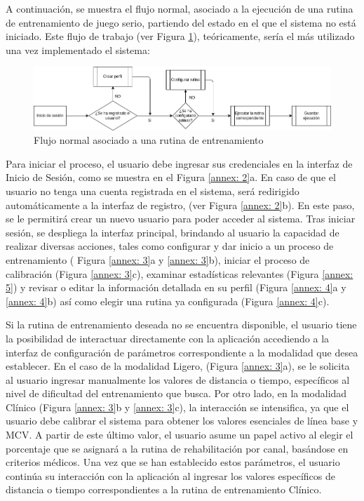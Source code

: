 A continuación, se muestra el flujo normal, asociado a la ejecución de una rutina de entrenamiento de juego serio, partiendo del estado en el que el sistema no está iniciado. Este flujo de trabajo (ver Figura \ref{fig: diagram-flow}), teóricamente, sería el más utilizado una vez implementado el sistema:

\begin{figure}[!ht]
    \centering
    \includegraphics[scale=0.5]{images/diagram-flow.png}
    \caption{Flujo normal asociado a una rutina de entrenamiento}
    \label{fig: diagram-flow}
\end{figure}

Para iniciar el proceso, el usuario debe ingresar sus credenciales en la interfaz de Inicio de Sesión, como se muestra en el Figura \ref{annex: 2}a. En caso de que el usuario no tenga una cuenta registrada en el sistema, será redirigido automáticamente a la interfaz de registro, (ver Figura \ref{annex: 2}b). En este paso, se le permitirá crear un nuevo usuario para poder acceder al sistema. Tras iniciar sesión, se despliega la interfaz principal, brindando al usuario la capacidad de realizar diversas acciones, tales como configurar y dar inicio a un proceso de entrenamiento ( Figura \ref{annex: 3}a y \ref{annex: 3}b), iniciar el proceso de calibración (Figura \ref{annex: 3}c), examinar estadísticas relevantes (Figura \ref{annex: 5}) y revisar o editar la información detallada en su perfil (Figura \ref{annex: 4}a y \ref{annex: 4}b) así como elegir una rutina ya configurada (Figura \ref{annex: 4}c).

Si la rutina de entrenamiento deseada no se encuentra disponible, el usuario tiene la posibilidad de interactuar directamente con la aplicación accediendo a la interfaz de configuración de parámetros correspondiente a la modalidad que desea establecer. En el caso de la modalidad Ligero, (Figura \ref{annex: 3}a), se le solicita al usuario ingresar manualmente los valores de distancia o tiempo, específicos al nivel de dificultad del entrenamiento que busca. Por otro lado, en la modalidad Clínico (Figura \ref{annex: 3}b y \ref{annex: 3}c), la interacción se intensifica, ya que el usuario debe calibrar el sistema para obtener los valores esenciales de línea base y MCV. A partir de este último valor, el usuario asume un papel activo al elegir el porcentaje que se asignará a la rutina de rehabilitación por canal, basándose en criterios médicos. Una vez que se han establecido estos parámetros, el usuario continúa su interacción con la aplicación al ingresar los valores específicos de distancia o tiempo correspondientes a la rutina de entrenamiento Clínico.

